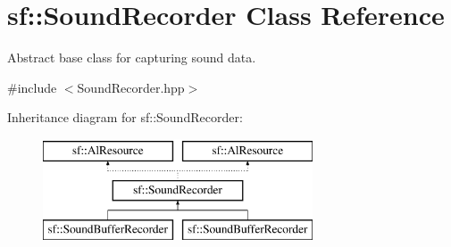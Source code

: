 \hypertarget{classsf_1_1_sound_recorder}{\section{sf\-:\-:Sound\-Recorder Class Reference}
\label{classsf_1_1_sound_recorder}
}


Abstract base class for capturing sound data.  




{\ttfamily \#include $<$Sound\-Recorder.\-hpp$>$}

Inheritance diagram for sf\-:\-:Sound\-Recorder\-:\begin{figure}[H]
\begin{center}
\leavevmode
\includegraphics[height=3.000000cm]{classsf_1_1_sound_recorder}
\end{center}
\end{figure}
